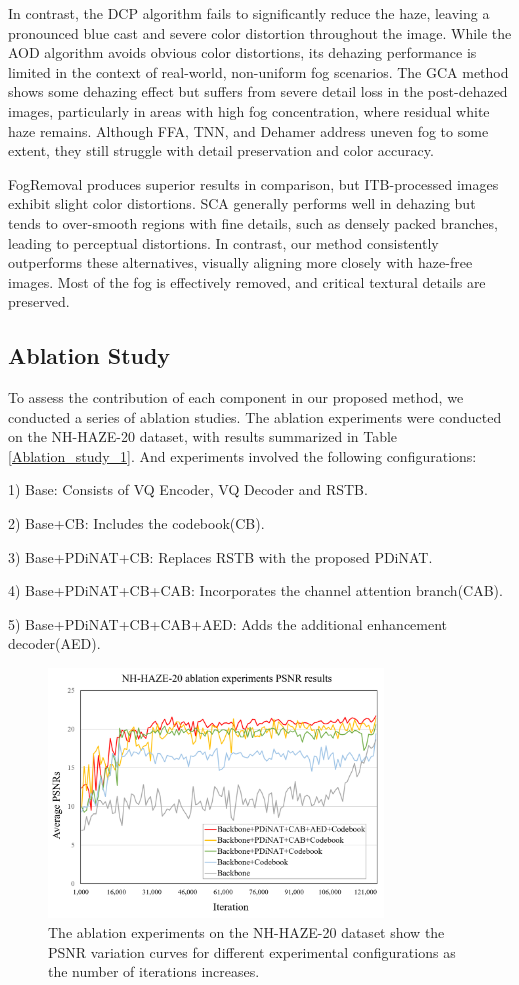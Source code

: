 \documentclass[lettersize,journal]{IEEEtran}
\begin{document}
In contrast, the DCP algorithm fails to significantly reduce the haze, leaving a pronounced blue cast and severe color distortion throughout the image. While the AOD algorithm avoids obvious color distortions, its dehazing performance is limited in the context of real-world, non-uniform fog scenarios. The GCA method shows some dehazing effect but suffers from severe detail loss in the post-dehazed images, particularly in areas with high fog concentration, where residual white haze remains. Although FFA, TNN, and Dehamer address uneven fog to some extent, they still struggle with detail preservation and color accuracy.

FogRemoval produces superior results in comparison, but ITB-processed images exhibit slight color distortions. SCA generally performs well in dehazing but tends to over-smooth regions with fine details, such as densely packed branches, leading to perceptual distortions. In contrast, our method consistently outperforms these alternatives, visually aligning more closely with haze-free images. Most of the fog is effectively removed, and critical textural details are preserved.

\subsection{Ablation Study}
To assess the contribution of each component in our proposed method, we conducted a series of ablation studies. The ablation experiments were conducted on the NH-HAZE-20 dataset, with results summarized in Table \ref{Ablation_study_1}. And experiments involved the following configurations:

1) Base: Consists of VQ Encoder, VQ Decoder and RSTB\cite{liang2021swinir}.

2) Base+CB: Includes the codebook(CB).

3) Base+PDiNAT+CB: Replaces RSTB with the proposed PDiNAT.

4) Base+PDiNAT+CB+CAB: Incorporates the channel attention branch(CAB).

5) Base+PDiNAT+CB+CAB+AED: Adds the additional enhancement decoder(AED).

\begin{figure}[!t]
	\centering
	\includegraphics[width=3.5in]{ablation_experiments}
	\caption{The ablation experiments on the NH-HAZE-20 dataset show the PSNR variation curves for different experimental configurations as the number of iterations increases.}
	\label{Ablation_study_2}
\end{figure}
 
\end{document}
